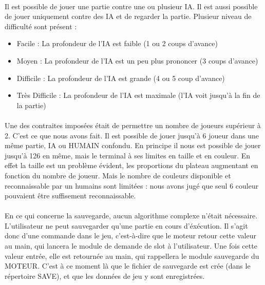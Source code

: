 \documentclass{report}
\begin{document}
        \paragraph*{} %
	Il est possible de jouer une partie contre une ou plusieur IA. Il est aussi possible de jouer uniquement contre des IA et de regarder la partie. 
	Plusieur niveau de difficulté sont présent : \\
	\begin{itemize}
		\item Facile : La profondeur de l'IA est faible (1 ou 2 coups d'avance) 
		\item Moyen : La profondeur de l'IA est un peu plus prononcer (3 coups d'avance) 
		\item Difficile : La profondeur de l'IA est grande (4 ou 5 coup d'avance) 
		\item Très Difficile : La profondeur de l'IA est maximale (l'IA voit jusqu'à la fin de la partie) \\
	\end{itemize}

        \paragraph*{} %
	Une des contraites imposées était de permettre un nombre de joueurs supérieur à 2.
	C'est ce que nous avons fait. Il est possible de jouer jusqu'à 6 joueur dans une même partie, IA ou HUMAIN confondu. 
	En principe il nous est possible de jouer jusqu'à 126 en même, mais le terminal à ses limites en taille et en couleur.
	En effet la taille est un problème évident, les proportions du plateau augmentant en fonction du nombre de joueur.
	Mais le nombre de couleurs disponible et reconnaissable par un humains sont limitées : nous avons jugé que seul 6 couleur pouvaient être suffisement reconnaissable.\\ 

        \paragraph*{} %
	En ce qui concerne la sauvegarde, aucun algorithme complexe n'était nécessaire. L'utilisateur ne peut sauvegarder qu'une partie en cours d'éxécution. Il s'agit donc d'une commande dans le jeu, c'est-à-dire que le moteur retour cette valeur au main, qui lancera le module de demande de slot à l'utilisateur. 
	Une fois cette valeur entrée, elle est retournée au main, qui rappellera le module sauvegarde du MOTEUR.
	C'est à ce moment là que le fichier de sauvegarde est crée (dans le répertoire SAVE), et que les données de jeu y sont enregistrées.\\
	
\end{document}
